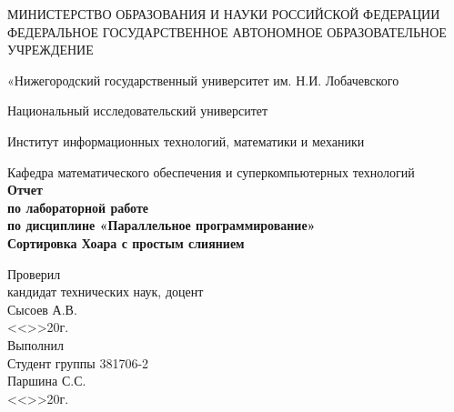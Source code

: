 \documentclass[a4paper]{report}
\begin{document}
	\begin{titlepage}
				\center 
				\par МИНИСТЕРСТВО ОБРАЗОВАНИЯ И НАУКИ РОССИЙСКОЙ ФЕДЕРАЦИИ
				ФЕДЕРАЛЬНОЕ ГОСУДАРСТВЕННОЕ АВТОНОМНОЕ ОБРАЗОВАТЕЛЬНОЕ УЧРЕЖДЕНИЕ 
				\par «Нижегородский государственный университет им. Н.И. Лобачевского\\[0.2cm]
				\par Национальный исследовательский университет\\[0.1cm]
				\par Институт информационных технологий, математики и механики \\[0.1cm]
				\par Кафедра математического обеспечения и суперкомпьютерных технологий\\[2.5cm]		
		{\huge \bfseries Отчет \\[0.1cm]
			\Large \mdseries по лабораторной работе \\[0,1cm]
			\Large \mdseries по дисциплине «Параллельное программирование» \\[1cm]
			\Large \bfseries Сортировка Хоара с простым слиянием}\\[3cm]
		
		\begin{flushright} \large
			{Проверил} \\[0.1cm]
			{кандидат технических наук, доцент}\\[0.1cm]
			{\underline{\hspace{2,35in}} Сысоев А.В.}\\[0.1cm]
			{<<\underline{\hspace{0,25in}}>>\underline{\hspace{2,55in}}20\underline{\hspace{0,3in}}г.} \\[0.1cm]
			{Выполнил} \\[0.1cm]
			{Студент группы 381706-2} \\[0.1cm]
			{\underline{\hspace{2,1in}} Паршина С.С.} \\[0.1cm]
			{<<\underline{\hspace{0,25in}}>>\underline{\hspace{2,55in}}20\underline{\hspace{0,3in}}г.} \\[3cm]
		\end{flushright}
		
	\end{titlepage}
	
\end{document}
